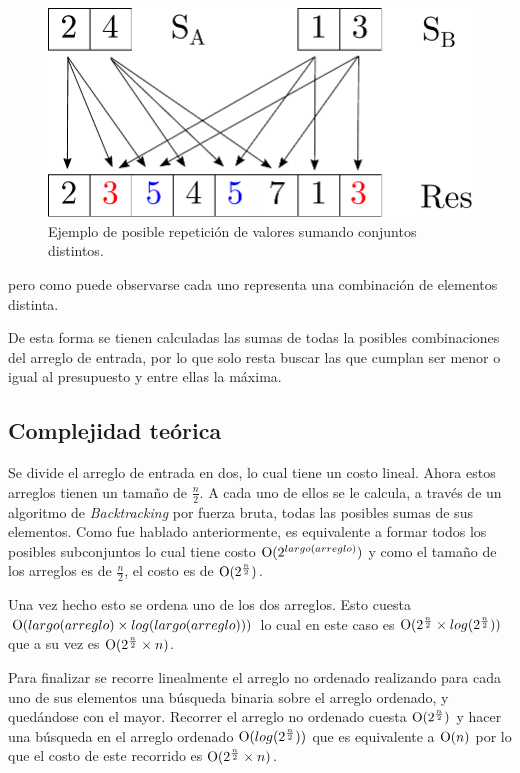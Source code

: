 \begin{figure}[H]
	\centering
	\includegraphics[scale=0.6]{imagenes/ex1_example2.pdf}
	\caption{Ejemplo de posible repetición de valores sumando conjuntos
	distintos.}
	\label{ej1:fig:value_repetition}
\end{figure}


pero como puede observarse cada uno representa una combinación de elementos
distinta.

De esta forma se tienen calculadas las sumas de todas la posibles combinaciones
del arreglo de entrada, por lo que solo resta buscar las que cumplan ser menor o
igual al presupuesto y entre ellas la máxima.


\subsection{Complejidad teórica}

Se divide el arreglo de entrada en dos, lo cual tiene un costo lineal. Ahora
estos arreglos tienen un tamaño de $\frac{n}{2}$. A cada uno de ellos se le
calcula, a través de un algoritmo de \textit{Backtracking} por fuerza bruta,
todas las posibles sumas de sus elementos. Como fue hablado anteriormente, es
equivalente a formar todos los posibles subconjuntos lo cual tiene costo
$\operatorname{O}(2^{largo(arreglo)})$  y como el tamaño de los arreglos es de
$\frac{n}{2}$, el costo es de $\operatorname{O}(2^{\frac{n}{2}})$.

Una vez hecho esto se ordena uno de los dos arreglos. Esto cuesta
$\operatorname{O}(largo(arreglo) \times log(largo(arreglo)))$ lo cual en este caso es
$\operatorname{O}(2^{\frac{n}{2}} \times log(2^{\frac{n}{2}}))$ que a su vez es
$\operatorname{O}(2^{\frac{n}{2}} \times n)$.

Para finalizar se recorre linealmente el arreglo no ordenado realizando para
cada uno de sus elementos una búsqueda binaria sobre el arreglo ordenado, y
quedándose con el mayor. Recorrer el arreglo no ordenado cuesta
$\operatorname{O}(2^{\frac{n}{2}})$ y hacer una búsqueda en el arreglo ordenado
$\operatorname{O}(log(2^{\frac{n}{2}}))$ que es equivalente a $\operatorname{O}(n)$ por lo que el costo
de este recorrido es $\operatorname{O}(2^{\frac{n}{2}} \times n)$.

